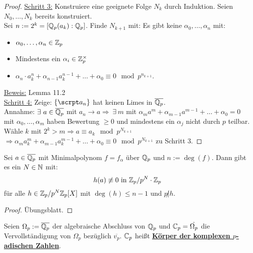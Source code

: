 \begin{proof}
\underline{Schritt 3:} Konstruiere eine geeignete Folge $N_k$ durch Induktion. Seien $N_0, \dots, N_k$ bereits konstruiert.\\
Sei $n:=2^k=[\mathbb{Q}_p(a_k):\mathbb{Q}_p]$. Finde $N_{k+1}$ mit: Es gibt keine $\alpha_0, \dots, \alpha_n$ mit:
\begin{itemize}
\item $\alpha_0, \dots, \alpha_n \in \mathbb{Z}_p$
\item Mindestens ein $\alpha_i \in \mathbb{Z}^\times_p$
\item $\alpha_n\cdot a_k^n + \alpha_{n-1} a_k^{n-1} + \ldots + \alpha_0 \equiv
0 \mod p^{n_{k+1}}$.
\end{itemize}
\underline{Beweis:} Lemma 11.2\\
\underline{Schritt 4:} Zeige: $\{\a_n\}$ hat keinen Limes in $\overline{\mathbb{Q}_p}$.\\
Annahme: $\exists \ a \in \overline{\mathbb{Q}_p}$ mit $a_n \to a \Rightarrow \ \exists \ m $ mit $\alpha_m a^m+\alpha_{m-1}a^{m-1}+\ldots+\alpha_0=0$ mit $\alpha_0, \ldots, \alpha_m$ haben Bewertung $\geq 0$ und mindestens ein $\alpha_j$ nicht durch $p$ teilbar.\\
Wähle $k$ mit $2^k > m \Rightarrow a \equiv a_k \mod p^{N_{k+1}}$\\
$\Rightarrow \alpha_m a_k^m + \alpha_{m-1} a_k^{m-1} + \ldots + \alpha_0 \equiv 0 \mod p^{N_{k+1}}$ \Lightning zu Schritt 3.
\end{proof}

\begin{Lem}
Sei $a \in \overline{\mathbb{Q}_p}$ mit Minimalpolynom $f=f_\alpha$ über $\mathbb{Q}_p$ und $n:=\deg(f)$. Dann gibt es ein $N \in \mathbb{N}$ mit:
\[h(a) \not \equiv 0 \text{ in } \mathbb{Z}_p/p^N\cdot \mathbb{Z}_p\]
für alle $h \in \mathbb{Z}_p/p^N\mathbb{Z}_p[X]$ mit $\deg(h) \leq n-1$ und $p \not | h$.
\end{Lem}

\begin{proof}
Übungsblatt.
\end{proof}

\begin{defi}
Seien $\Omega_p:=\overline{\mathbb{Q}_p}$ der algebraische Abschluss von $\mathbb{Q}_p$ und $\mathbb{C}_p=\hat{\Omega_p}$ die Vervollständigung von $\Omega_p$ bezüglich $\overline{v_p}$. $\mathbb{C}_p$ heißt \underline{\textbf{Körper der komplexen $p$-adischen Zahlen}}.
\end{defi}


